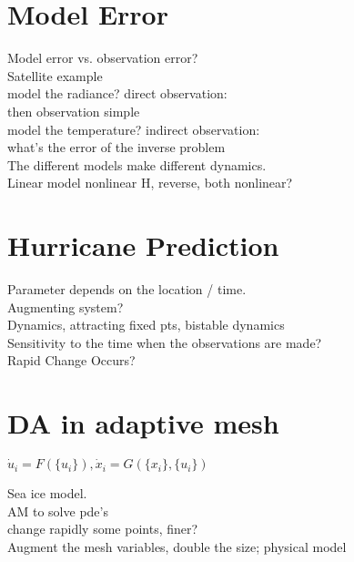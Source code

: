 \documentclass[10pt,a4paper]{article}
\begin{document}
\section{Model Error}

Model error vs. observation error?\\

Satellite example\\


model the radiance? direct observation:\\
then observation simple\\

model the temperature? indirect observation:\\
what's the error of the inverse problem\\

The different models make different dynamics.\\

Linear model nonlinear H, reverse, both nonlinear?\\

\section{Hurricane Prediction}
Parameter depends on the location / time.\\

Augmenting system? \\

Dynamics, attracting fixed pts, bistable dynamics\\

Sensitivity to the time when the observations are made?\\
Rapid Change Occurs?

\section{DA in adaptive mesh}

$\dot{u}_i=F(\{u_i\}),\dot{x}_i=G(\{x_i\},\{u_i\})$

Sea ice model.\\

AM to solve pde's\\

change rapidly some points, finer?\\

Augment the mesh variables, double the size; physical model\\
\end{document}
